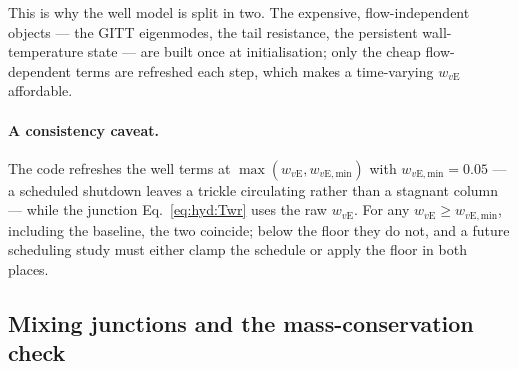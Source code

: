 This is why the well model is split in two. The expensive, flow-independent objects --- the
GITT eigenmodes, the tail resistance, the persistent wall-temperature state --- are built once
at initialisation; only the cheap flow-dependent terms are refreshed each step, which makes a
time-varying $w_{v\mathrm{E}}$ affordable.

\paragraph{A consistency caveat.} The code refreshes the well terms at
$\max(w_{v\mathrm{E}},w_{v\mathrm{E,min}})$ with $w_{v\mathrm{E,min}}=\num{0.05}$ --- a
scheduled shutdown leaves a trickle circulating rather than a stagnant column --- while the
junction Eq.~\eqref{eq:hyd:Twr} uses the raw $w_{v\mathrm{E}}$. For any $w_{v\mathrm{E}}\ge
w_{v\mathrm{E,min}}$, including the baseline, the two coincide; below the floor they do not,
and a future scheduling study must either clamp the schedule or apply the floor in both places.

\subsection{Mixing junctions and the mass-conservation check}
\label{sec:hyd:mixing}

